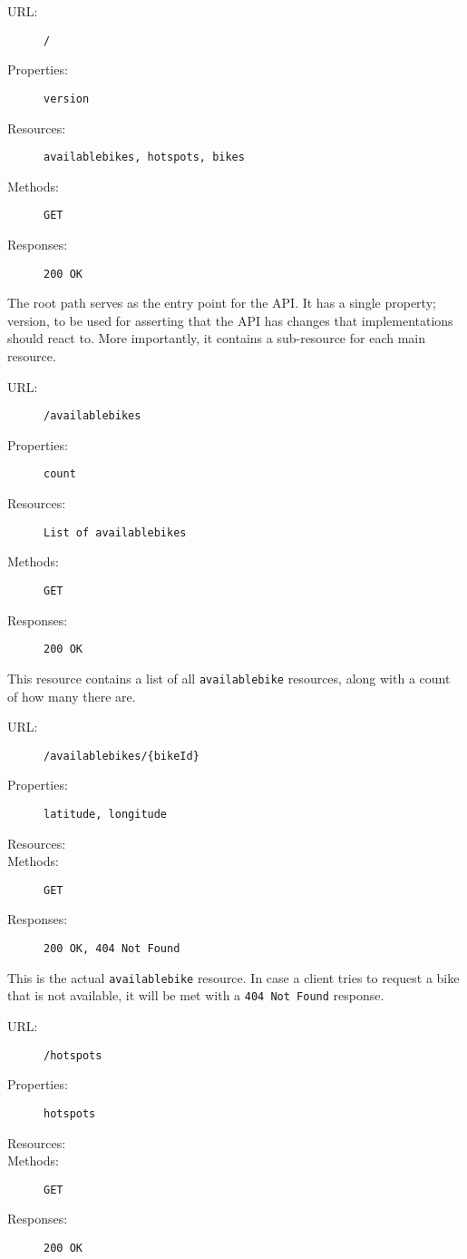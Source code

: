 \newcommand{\resource}[5]{\begin{description}
\item[URL:]{\texttt{#1}}
\item[Properties:]{\texttt{#2}}
\item[Resources:]{\texttt{#3}}
\item[Methods:]{\texttt{#4}}
\item[Responses:]{\texttt{#5}}
\end{description}}

\resource{/}{version}{availablebikes, hotspots, bikes}{GET}{200 OK}
The root path serves as the entry point for the API.
It has a single property; version, to be used for asserting that the API has changes that implementations should react to.
More importantly, it contains a sub-resource for each main resource.

\noindent\hrulefill

\resource{/availablebikes}{count}{List of availablebikes}{GET}{200 OK}
This resource contains a list of all \texttt{availablebike} resources, along with a count of how many there are.

\noindent\hrulefill

\resource{/availablebikes/\{bikeId\}}{latitude, longitude}{}{GET}{200 OK, 404 Not Found}
This is the actual \texttt{availablebike} resource.
In case a client tries to request a bike that is not available, it will be met with a \texttt{404 Not Found} response.

\noindent\hrulefill

\resource{/hotspots}{hotspots}{}{GET}{200 OK}
